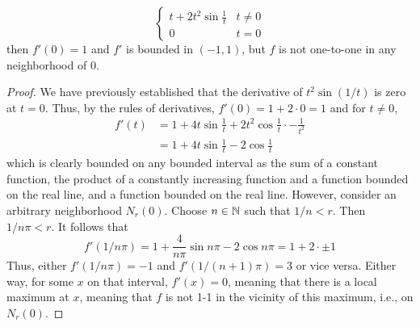 \documentclass[../psets.tex]{subfiles}
\begin{document}
\begin{enumerate}[label={\textbf{\arabic*.}}]
\begin{equation*}
        \begin{cases}
            t+2t^2\sin\frac{1}{t} & t\neq 0\\
            0 & t=0
        \end{cases}
    \end{equation*}
    then $f'(0)=1$ and $f'$ is bounded in $(-1,1)$, but $f$ is not one-to-one in any neighborhood of 0.
    \begin{proof}
        We have previously established that the derivative of $t^2\sin(1/t)$ is zero at $t=0$. Thus, by the rules of derivatives, $f'(0)=1+2\cdot 0=1$ and for $t\neq 0$,
        \begin{align*}
            f'(t) &= 1+4t\sin\frac{1}{t}+2t^2\cos\frac{1}{t}\cdot-\frac{1}{t^2}\\
            &= 1+4t\sin\frac{1}{t}-2\cos\frac{1}{t}
        \end{align*}
        which is clearly bounded on any bounded interval as the sum of a constant function, the product of a constantly increasing function and a function bounded on the real line, and a function bounded on the real line. However, consider an arbitrary neighborhood $N_r(0)$. Choose $n\in\mathbb{N}$ such that $1/n<r$. Then $1/n\pi<r$. It follows that
        \begin{equation*}
            f'(1/n\pi) = 1+\frac{4}{n\pi}\sin n\pi-2\cos n\pi
            = 1+2\cdot\pm 1
        \end{equation*}
        Thus, either $f'(1/n\pi)=-1$ and $f'(1/(n+1)\pi)=3$ or vice versa. Either way, for some $x$ on that interval, $f'(x)=0$, meaning that there is a local maximum at $x$, meaning that $f$ is not 1-1 in the vicinity of this maximum, i.e., on $N_r(0)$.
    \end{proof}
\end{enumerate}
\end{document}
